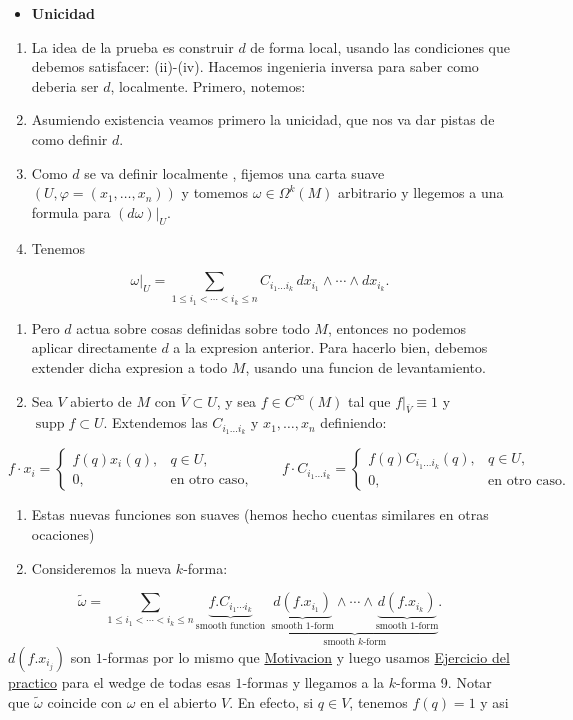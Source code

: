 \begin{bookproof}{}
\begin{itemize}
\item \textbf{Unicidad}
\end{itemize}
\begin{enumerate}
\item La idea de la prueba es construir $d$ de forma local, usando las condiciones que debemos satisfacer: (ii)-(iv). Hacemos ingenieria inversa para saber como deberia ser $d$, localmente. Primero, notemos:
\item Asumiendo existencia veamos primero la unicidad, que nos va dar pistas de como definir $d$.
\item Como $d$ se va definir localmente , fijemos una carta suave $(U,\varphi=(x_1,\ldots,x_n))$ y tomemos $\omega\in\Omega^k(M)$ arbitrario y llegemos a una formula para $(d\omega)|_U$.
\item Tenemos
\end{enumerate}
\[
\omega|_U=\sum_{1\le i_1<\cdots<i_k\le n}C_{i_1\ldots i_k}\,dx_{i_1}\wedge\cdots\wedge dx_{i_k}.
\]
\begin{enumerate}[start=5]
\item Pero $d$ actua sobre cosas definidas sobre todo $M$, entonces no podemos aplicar directamente $d$ a la expresion anterior. Para hacerlo bien, debemos extender dicha expresion a todo $M$, usando una funcion de levantamiento.
\item Sea $V$ abierto de $M$ con $\overline V\subset U$, y sea $f\in C^\infty(M)$ tal que $f|_{\overline V}\equiv1$ y $\operatorname{supp}f\subset U$. Extendemos las $C_{i_1\ldots i_k}$ y $x_1,\ldots,x_n$ definiendo:
\end{enumerate}
\[
f\cdot x_i=\begin{cases}f(q)x_i(q),&q\in U,\\0,&\text{en otro caso},\end{cases}\qquad f\cdot C_{i_1\ldots i_k}=\begin{cases}f(q)C_{i_1\ldots i_k}(q),&q\in U,\\0,&\text{en otro caso}.\end{cases}
\]
\begin{enumerate}[start=7]
\item Estas nuevas funciones son suaves (hemos hecho cuentas similares en otras ocaciones)
\item Consideremos la nueva $k$-forma:
\end{enumerate}
\[
\widetilde{\omega}=\sum_{1\le i_1<\cdots<i_k\le n}\underbrace{f.C_{i_1\cdots i_k}}_{\text{smooth function}}\ \ \underbrace{\underbrace{d(f.x_{i_1})}_{\text{smooth }1\text{-form}}\wedge\cdots\wedge\underbrace{d(f.x_{i_k})}_{\text{smooth }1\text{-form}}}_{\text{smooth }k\text{-form}}.
\]
$d(f.x_{i_{j}})$ son $1$-formas por lo mismo que \hyperref[blk:171d2a]{Motivacion} y luego usamos \hyperref[blk:ce25ad]{Ejercicio del practico} para el wedge de todas esas $1$-formas y llegamos a la $k$-forma 9. Notar que $\widetilde\omega$ coincide con $\omega$ en el abierto $V$. En efecto, si $q\in V$, tenemos $f(q)=1$ y asi


\end{bookproof}
